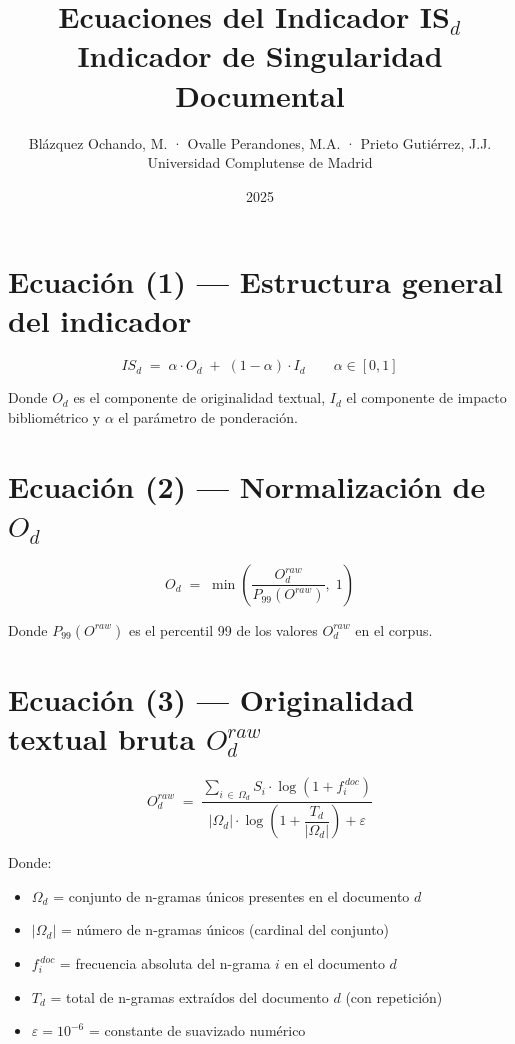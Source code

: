 \documentclass[12pt]{article}
\title{Ecuaciones del Indicador IS$_d$\\
\large Indicador de Singularidad Documental}
\author{Blázquez Ochando, M. · Ovalle Perandones, M.A. · Prieto Gutiérrez, J.J.\\
Universidad Complutense de Madrid}
\date{2025}
\begin{document}
\maketitle

\section*{Ecuación (1) — Estructura general del indicador}

\begin{equation}
IS_d \;=\; \alpha \cdot O_d \;+\; (1-\alpha) \cdot I_d
\qquad \alpha \in [0,1]
\label{eq:isd}
\end{equation}

\noindent
Donde $O_d$ es el componente de originalidad textual, $I_d$ el componente de
impacto bibliométrico y $\alpha$ el parámetro de ponderación.

\section*{Ecuación (2) — Normalización de $O_d$}

\begin{equation}
O_d \;=\; \min\!\left(\frac{O_d^{raw}}{P_{99}(O^{raw})},\; 1\right)
\label{eq:od}
\end{equation}

\noindent
Donde $P_{99}(O^{raw})$ es el percentil 99 de los valores $O_d^{raw}$ en el corpus.

\section*{Ecuación (3) — Originalidad textual bruta $O_d^{raw}$}

\begin{equation}
O_d^{raw} \;=\;
\frac{\displaystyle\sum_{i \,\in\, \Omega_d} S_i \cdot \log\!\left(1 + f_i^{\,doc}\right)}
     {\;\left|\Omega_d\right| \cdot \log\!\!\left(1 + \dfrac{T_d}{\left|\Omega_d\right|}\right) + \varepsilon\;}
\label{eq:odraw}
\end{equation}

\noindent
Donde:
\begin{itemize}
  \item $\Omega_d$ = conjunto de n-gramas únicos presentes en el documento $d$
  \item $|\Omega_d|$ = número de n-gramas únicos (cardinal del conjunto)
  \item $f_i^{\,doc}$ = frecuencia absoluta del n-grama $i$ en el documento $d$
  \item $T_d$ = total de n-gramas extraídos del documento $d$ (con repetición)
  \item $\varepsilon = 10^{-6}$ = constante de suavizado numérico
\end{itemize}
\end{document}
